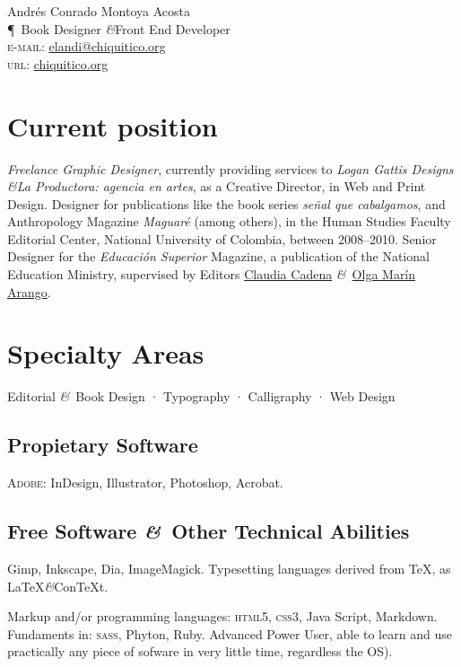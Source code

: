 \documentclass[12pt,final,usenames,dvipsnames]{article}
\newcommand{\signo}{\LARGE\P}
\newcommand{\amper}{\textit{\&}\space}
\begin{document}
{\LARGE Andrés Conrado Montoya Acosta}\\
{\signo\large\ Book Designer \amper Front End Developer}\\[24pt]
\textsc{e-mail}: \href{mailto:elandi@chiquitico.org}{elandi@chiquitico.org}\\
\textsc{url}: \href{http://chiquitico.org}{chiquitico.org} 
\vfill

\section*{Current position}
\emph{Freelance Graphic Designer}, currently providing services to \emph{Logan Gattis Designs} \amper \emph{La Productora: agencia en artes}, as a Creative Director, in Web and Print Design. Designer for publications like the book series \emph{señal que cabalgamos}, and Anthropology Magazine \emph{Maguaré} (among others), in the Human Studies Faculty Editorial Center, National University of Colombia, between 2008--2010. Senior Designer for the \emph{Educación Superior} Magazine, a publication of the National Education Ministry, supervised by Editors \href{mailto:cadenasilva@fibertel.com.ar}{Claudia Cadena} \amper\ \href{mailto:olgamarinarango@gmail.com}{Olga Marín Arango}.

\section*{Specialty Areas}
Editorial \amper\ Book Design · Typography · Calligraphy · Web Design

\subsection*{Propietary Software}
\textsc{Adobe:} InDesign, Illustrator, Photoshop, Acrobat.

\subsection*{Free Software \amper\ Other Technical Abilities} 
Gimp, Inkscape, Dia, ImageMagick. Typesetting languages derived from \TeX, as La\TeX\space\amper \space Con\TeX t. 

Markup and/or programming languages: \textsc{html5}, \textsc{css3}, Java Script, Markdown. Fundaments in: \textsc{sass}, Phyton, Ruby.  Advanced Power User, able to learn and use practically any piece of sofware in very little time, regardless the OS).
\end{document}
